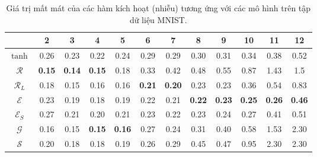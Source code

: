 \begin{table}[ht!]
\centering
\def\arraystretch{1.3}
\begin{tabular}{c|c|c|c|c|c|c|c|c|c|c|c|}
\cline{2-12}
                        & 2    & 3    & 4    & 5    & 6    & 7    & 8    & 9    & 10   & 11   & 12   \\ \hline
\multicolumn{1}{|c|}{$\tanh$} & 0.26 & 0.23 & 0.22 & 0.24 & 0.29 & 0.29 & 0.30 & 0.31 & 0.34 & 0.38 & 0.52 \\ \hline
\multicolumn{1}{|c|}{$\mathcal{R}$} & \textbf{0.15} & \textbf{0.14} & \textbf{0.15} & 0.18 & 0.33 & 0.42 & 0.48 & 0.55 & 0.87 & 1.43 & 1.5  \\ \hline
\multicolumn{1}{|c|}{$\mathcal{R}_L$} & 0.18 & 0.15 & 0.16 & 0.16 & \textbf{0.21} & \textbf{0.20} & 0.23 & 0.23 & 0.36 & 0.54 & 0.83 \\ \hline
\multicolumn{1}{|c|}{$\mathcal{E}$} & 0.23 & 0.19 & 0.18 & 0.19 & 0.22 & 0.21 & \textbf{0.22} & \textbf{0.23} & \textbf{0.25} & \textbf{0.26} & \textbf{0.46} \\ \hline
\multicolumn{1}{|c|}{$\mathcal{E}_S$} & 0.27 & 0.21 & 0.20 & 0.21 & 0.23 & 0.22 & 0.23 & 0.24 & 0.27 & 0.41 & 0.51 \\ \hline
\multicolumn{1}{|c|}{$\mathcal{G}$} & 0.16 & 0.15 & \textbf{0.15} & \textbf{0.16} & 0.27 & 0.24 & 0.31 & 0.40 & 0.58 & 1.53 & 2.30 \\ \hline
\multicolumn{1}{|c|}{$\mathcal{S}$} & 0.20 & 0.18 & 0.18 & 0.19 & 0.26 & 0.29 & 0.45 & 0.47 & 0.95 & 2.30 & 2.30 \\ \hline
\end{tabular}
\caption{Giá trị mất mát của các hàm kích hoạt (nhiễu) tương ứng với các mô hình trên tập dữ liệu MNIST.}
\label{tab:wowinoiseloss}
\end{table}

